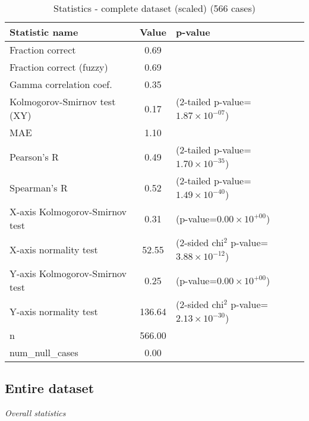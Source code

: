 \documentclass[10pt, letterpaper, oneside, titlepage, landscape]{scrreprt}
\begin{document}
\begin{table}[H]\begin{center}
\begin{tabular}{ l S[table-format=3.2] l}
Statistic name & {Value} & p-value\\
\hline
Fraction correct & 0.69 & \\
Fraction correct (fuzzy) & 0.69 & \\
Gamma correlation coef. & 0.35 & \\
Kolmogorov-Smirnov test (XY) & 0.17 & (2-tailed p-value=$1.87\times10^{-07}$)\\
MAE & 1.10 & \\
Pearson's R & 0.49 & (2-tailed p-value=$1.70\times10^{-35}$)\\
Spearman's R & 0.52 & (2-tailed p-value=$1.49\times10^{-40}$)\\
X-axis Kolmogorov-Smirnov test & 0.31 & (p-value=$0.00\times10^{+00}$)\\
X-axis normality test & 52.55 & (2-sided chi$^{2}$ p-value=$3.88\times10^{-12}$)\\
Y-axis Kolmogorov-Smirnov test & 0.25 & (p-value=$0.00\times10^{+00}$)\\
Y-axis normality test & 136.64 & (2-sided chi$^{2}$ p-value=$2.13\times10^{-30}$)\\
n & 566.00 & \\
num\_null\_cases & 0.00 & \\
\end{tabular}
\caption{Statistics - complete dataset (scaled) (566 cases)}
\end{center}\end{table}


\subsection{Entire dataset}
\textit{Overall statistics}
\end{document}
